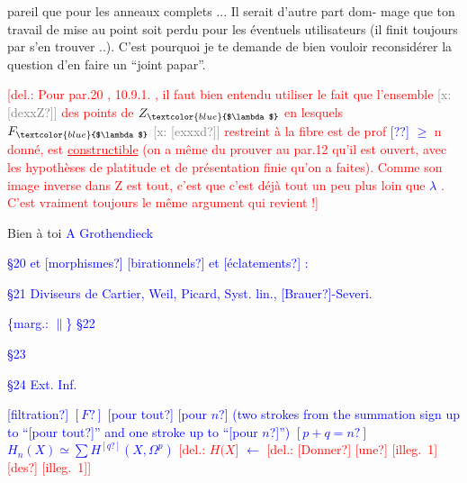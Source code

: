 \documentclass[11pt]{article}
\newcommand{\scanpage}[1]{\par\bigskip\noindent{\small\sffamily[scan #1]}\par}
\newcommand{\mspage}[1]{{\small\sffamily[p.\,#1]}}
\newcommand{\hand}[1]{\textcolor{blue}{#1}}
\newcommand{\margin}[1]{\textcolor{blue}{\{\textsf{marg.:} #1\}}}
\newcommand{\deleted}[1]{\textcolor{red}{[\textsf{del.:} #1]}}
\newcommand{\xout}[1]{\textcolor{gray}{[\textsf{x:} #1]}}
\newcommand{\uline}[1]{\underline{#1}}
\newcommand{\unsure}[1]{[#1?]}
\newcommand{\illegible}[1]{[\textsf{illeg.\ #1}]}
\begin{document}
pareil que pour les anneaux complets ... Il serait d'autre part dom-%
mage que ton travail de mise au point soit perdu pour les éventuels
utilisateurs (il finit toujours par s'en trouver ..). C'est pourquoi
je te demande de bien vouloir reconsidérer la question d'en faire un
``joint papar''.

\deleted{Pour par.20 , 10.9.1. , il faut bien entendu utiliser le
fait que l'ensemble \xout{\unsure{dexxZ}} des points de $Z_{\hand{$\lambda$}}$ en lesquels $F_{\hand{$\lambda$}}$ \xout{\unsure{exxxd}}
restreint à la fibre est de prof \hand{\unsure{?}} \hand{$\geq$} n donné, est \uline{constructible}
(on a même du prouver au par.12 qu'il est ouvert, avec les hypothèses
de platitude et de présentation finie qu'on a faites). Comme son image
inverse dans Z est tout, c'est que c'est déjà tout un peu plus loin
que \hand{$\lambda$} . C'est vraiment toujours le même argument qui revient !}

Bien à toi
\hand{A Grothendieck}

\mspage{135}

\clearpage
\scanpage{25/136}
\mspage{\hand{39}}

\hand{§20 \quad \unsure{Compléments} \unsure{appl.} \unsure{rationnelles} et \unsure{morphismes} \unsure{birationnels} et}
\hand{\unsure{éclatements} :}

\hand{§21 \quad Diviseurs de Cartier, Weil, Picard,}
\hand{Syst. lin., \unsure{Brauer}-Severi.}

\margin{$\|$} \hand{§22 \quad \unsure{Grassmanniennes}}

\hand{§23 \quad \unsure{Sections} \unsure{hyperplanes}}

\hand{§24 \quad Ext. Inf.}

\hand{\unsure{filtration} $\unsure{F}$}
\hand{\unsure{pour tout}} \qquad \hand{\unsure{pour $n$}}
\hand{(two strokes from the summation sign up to ``\unsure{pour tout}'' and one stroke up to ``\unsure{pour $n$}'')}
\hand{$\unsure{p+q=n}$}
\hand{$H_{n}(X) \simeq \sum H^{\unsure{q}}(X, \Omega^{p})$} \quad \hand{\deleted{$H(X$}}
\hand{$\longleftarrow$}
\hand{\deleted{\unsure{Donner} \unsure{une} \illegible{1} \unsure{des} \illegible{1}}}
\end{document}
